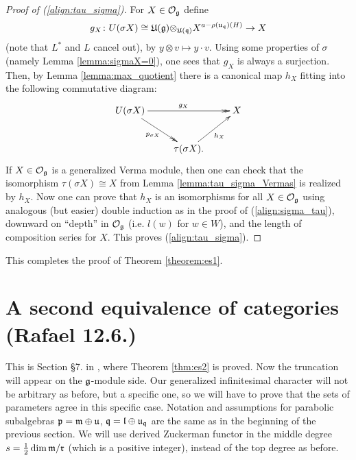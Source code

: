 \documentclass[a4paper,10pt]{article}
\begin{document}
\begin{proof}[Proof of (\ref{align:tau_sigma})]
For $X \in \mathcal{O}_{\mathfrak{g}}$ define
%
\[ g_X \colon U(\sigma X) \cong \mathfrak{U(g) \otimes_{U(q)}} X^{a- \rho(\mathfrak{u_q})(H)} \to X\]
%
(note that $L^\ast$ and $L$ cancel out), by $y \otimes v \mapsto y \cdot v$. Using some properties of $\sigma$ (namely Lemma \ref{lemma:sigmaX=0}),  one sees that $g_X$ is always a surjection. Then, by Lemma \ref{lemma:max_quotient} there is a canonical map $h_X$ fitting into the following commutative diagram:
%
\[ \xymatrix{ U(\sigma X) \ar@{->>}[rr]^{g_X} \ar@{->>}[rd]_{p_{\sigma X}} && X \\ & \tau (\sigma X) \ar[ru]_{h_X} .} \]
%
If $X \in \mathcal{O}_{\mathfrak{g}}$ is a generalized Verma module, then one can check that the isomorphism $\tau (\sigma X) \cong X$ from Lemma \ref{lemma:tau_sigma_Vermas} is realized by $h_X$. Now one can prove that $h_X$ is an isomorphisms for all $X \in \mathcal{O}_{\mathfrak{g}}$ using analogous (but easier) double induction as in the proof of (\ref{align:sigma_tau}), downward on ``depth'' in $\mathcal{O}_{\mathfrak{g}}$ (i.e. $l(w)$ for $w \in W$), and the length of composition series for $X$. This proves (\ref{align:tau_sigma}).
\end{proof}

This completes the proof of Theorem \ref{theorem:es1}.




\section{A second equivalence of categories (Rafael 12.6.)}

This is Section \S 7. in \cite{es}, where Theorem \ref{thm:es2} is proved. Now the truncation will appear on the $\mathfrak{g}$-module side. Our generalized infinitesimal character will not be arbitrary as before, but a specific one, so we will have to prove that the sets of parameters agree in this specific case. Notation and assumptions for parabolic subalgebras $\mathfrak{p=m \oplus u}$, $\mathfrak{q=l \oplus u_q}$ are the same as in the beginning of the previous section. We will use derived Zuckerman functor in the middle degree $s=\frac{1}{2}\dim \mathfrak{m/r}$ (which is a positive integer), instead of the top degree as before.
\end{document}
